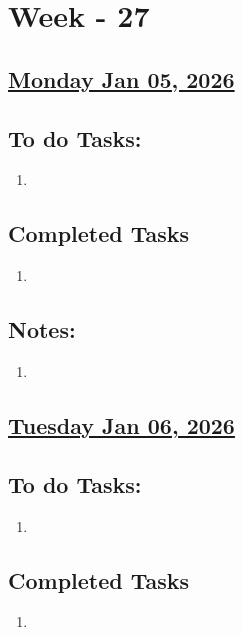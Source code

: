 \section{Week - 27}

\subsection*{\underline{Monday Jan 05, 2026}}
\subsection*{To do Tasks:}
\begin{enumerate}
    \item 
\end{enumerate}
\subsection*{Completed Tasks}
\begin{enumerate}[\ding{52}]  %
    \item 
\end{enumerate}
\subsection*{Notes:}
\begin{enumerate}
    \item 
\end{enumerate}
\subsection*{\underline{Tuesday Jan 06, 2026}}
\subsection*{To do Tasks:}
\begin{enumerate}
    \item  
\end{enumerate}
\subsection*{Completed Tasks}
\begin{enumerate}[\ding{52}]  %
    \item 
\end{enumerate}
